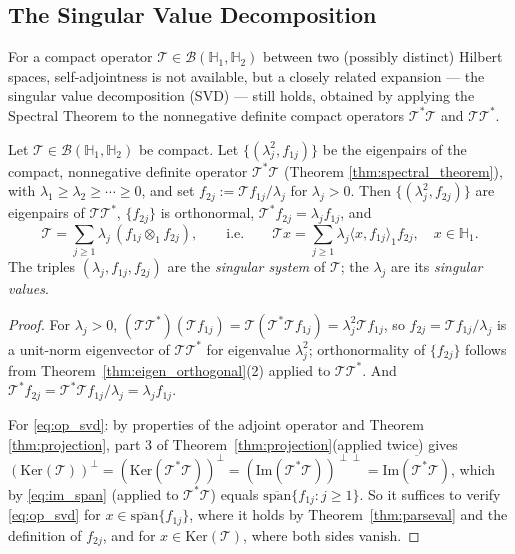 \subsection{The Singular Value Decomposition}
\label{subsec:svd}

For a compact operator $\mathcal{T}\in\mathcal{B}(\mathbb{H}_1,\mathbb{H}_2)$
between two (possibly distinct) Hilbert spaces, self-adjointness is not
available, but a closely related expansion --- the singular value
decomposition (SVD) --- still holds, obtained by applying the Spectral
Theorem to the nonnegative definite compact operators $\mathcal{T}^*
\mathcal{T}$ and $\mathcal{T}\mathcal{T}^*$.

\begin{theorem}
\label{thm:svd}
Let $\mathcal{T}\in\mathcal{B}(\mathbb{H}_1,\mathbb{H}_2)$ be compact. Let
$\{(\lambda_j^2,f_{1j})\}$ be the eigenpairs of the compact, nonnegative
definite operator $\mathcal{T}^*\mathcal{T}$ (Theorem
\ref{thm:spectral_theorem}), with $\lambda_1\geq\lambda_2\geq\cdots\geq 0$,
and set $f_{2j}:=\mathcal{T}f_{1j}/\lambda_j$ for $\lambda_j>0$. Then
$\{(\lambda_j^2,f_{2j})\}$ are eigenpairs of $\mathcal{T}\mathcal{T}^*$,
$\{f_{2j}\}$ is orthonormal, $\mathcal{T}^*f_{2j}=\lambda_jf_{1j}$, and
\begin{equation}
\mathcal{T} = \sum_{j\geq 1}\lambda_j\,(f_{1j}\otimes_1 f_{2j}), \qquad
\text{i.e.}\qquad \mathcal{T}x = \sum_{j\geq 1}\lambda_j\langle
x,f_{1j}\rangle_1 f_{2j}, \quad x\in\mathbb{H}_1.
\label{eq:op_svd}
\end{equation}
The triples $(\lambda_j,f_{1j},f_{2j})$ are the \emph{singular system} of
$\mathcal{T}$; the $\lambda_j$ are its \emph{singular values}.
\end{theorem}

\begin{proof}
For $\lambda_j>0$, $(\mathcal{T}\mathcal{T}^*)(\mathcal{T}f_{1j}) =
\mathcal{T}(\mathcal{T}^*\mathcal{T}f_{1j}) = \lambda_j^2\mathcal{T}f_{1j}$,
so $f_{2j}=\mathcal{T}f_{1j}/\lambda_j$ is a unit-norm eigenvector of
$\mathcal{T}\mathcal{T}^*$ for eigenvalue $\lambda_j^2$; orthonormality of
$\{f_{2j}\}$ follows from Theorem~\ref{thm:eigen_orthogonal}(2) applied to
$\mathcal{T}\mathcal{T}^*$. And $\mathcal{T}^*f_{2j} = \mathcal{T}^*
\mathcal{T}f_{1j}/\lambda_j = \lambda_jf_{1j}$.

For \eqref{eq:op_svd}: by properties of the adjoint operator and Theorem
\ref{thm:projection}, part 3 of Theorem~\ref{thm:projection}(applied twice)
gives $(\mathrm{Ker}(\mathcal{T}))^\perp = (\mathrm{Ker}(\mathcal{T}^*
\mathcal{T}))^\perp = (\mathrm{Im}(\mathcal{T}^*\mathcal{T}))^{\perp\perp} =
\overline{\mathrm{Im}(\mathcal{T}^*\mathcal{T})}$, which by
\eqref{eq:im_span} (applied to $\mathcal{T}^*\mathcal{T}$) equals
$\overline{\mathrm{span}}\{f_{1j}:j\geq 1\}$. So it suffices to verify
\eqref{eq:op_svd} for $x\in\overline{\mathrm{span}}\{f_{1j}\}$, where it holds
by Theorem~\ref{thm:parseval} and the definition of $f_{2j}$, and for
$x\in\mathrm{Ker}(\mathcal{T})$, where both sides vanish.
\end{proof}

